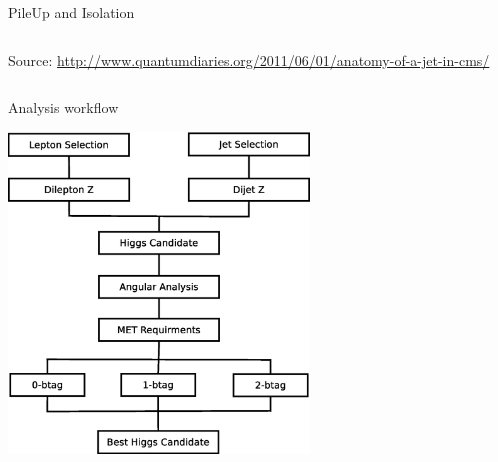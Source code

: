 \begin{frame}{PileUp and Isolation}
\begin{columns}
\begin{column}{0.5\textwidth}
\begin{center}
{\fontsize{.1cm}{.001em}\selectfont Source: \url{http://www.quantumdiaries.org/2011/06/01/anatomy-of-a-jet-in-cms/}}
\end{center}
\end{column}
\end{columns}
\end{frame}

\begin{frame}{Analysis workflow}
  \begin{center}
  \includegraphics[width=0.6\textwidth]{images/analysis_strategy.eps}
  \end{center}
\end{frame}

